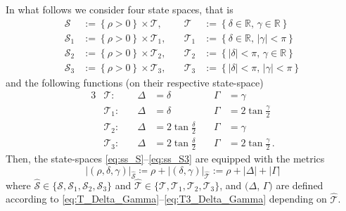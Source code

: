 \documentclass[journal,twoside,web]{ieeecolor}
\theoremstyle{definition}
\newcommand{\abs}[1]{\left\lvert#1\right\rvert}
\begin{document}
In what follows we consider four state spaces, that is 
\begin{align}
\mathcal{S}   &:= \left\{ \rho > 0 \right\} \times \mathcal{T},
& \quad \mathcal{T}   &:= \left\{ \delta \in \mathbb{R},\, \gamma \in \mathbb{R} \right\} \label{eq:ss_S}\\[2pt]
\mathcal{S}_1 &:= \left\{ \rho > 0 \right\} \times \mathcal{T}_1,
& \quad \mathcal{T}_1 &:= \left\{ \delta \in \mathbb{R},\, \abs{\gamma} < \pi \right\} \label{eq:ss_S1}\\[2pt]
\mathcal{S}_2 &:= \left\{ \rho > 0 \right\} \times \mathcal{T}_2,
& \quad \mathcal{T}_2 &:= \left\{ \abs{\delta} < \pi,\, \gamma \in \mathbb{R} \right\} \label{eq:ss_S2}\\[2pt]
\mathcal{S}_3 &:= \left\{ \rho > 0 \right\} \times \mathcal{T}_3,
& \quad \mathcal{T}_3 &:= \left\{ \abs{\delta} < \pi,\, \abs{\gamma} < \pi \right\} \label{eq:ss_S3}
\end{align}
and the following functions (on their respective state-space)
\begin{alignat}{3}
&\mathcal{T}:  &\quad  \Delta &= \delta  &\quad  \Gamma &= \gamma \label{eq:T_Delta_Gamma}\\
&\mathcal{T}_1: &\quad \Delta &= \delta  &\quad \Gamma &= 2\tan\frac{\gamma}{2} \label{eq:T1_Delta_Gamma} \\
&\mathcal{T}_2: &\quad \Delta &= 2\tan\tfrac{\delta}{2} &\quad  \Gamma &= \gamma   \label{eq:T2_Delta_Gamma} \\
&\mathcal{T}_3: &\quad \Delta &= 2\tan\tfrac{\delta}{2}  &\quad \Gamma &= 2\tan\tfrac{\gamma}{2}\,.\label{eq:T3_Delta_Gamma}
\end{alignat}
Then, the state-spaces \eqref{eq:ss_S}--\eqref{eq:ss_S3} are equipped with the metrics
\begin{equation}
|(\rho,\delta,\gamma)|_{\hat{\mathcal{S}}} \coloneqq \rho +\abs{ (\delta,\gamma)}_{\hat{\mathcal{T}}} :=  \rho + |\Delta| + |\Gamma| \label{eq:metric_S_hat}   
\end{equation}
where $\hat{\mathcal{S}} \in \{\mathcal{S}, \mathcal{S}_1, \mathcal{S}_2, \mathcal{S}_3\}$ and $\hat{\mathcal{T}} \in \{\mathcal{T}, \mathcal{T}_1, \mathcal{T}_2, \mathcal{T}_3\}$, and $(\Delta$, $\Gamma)$ are defined according to \eqref{eq:T_Delta_Gamma}--\eqref{eq:T3_Delta_Gamma} depending on $\hat{\mathcal{T}}$.
\end{document}
